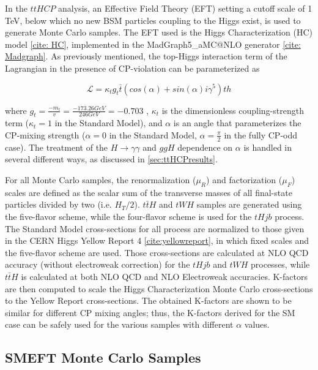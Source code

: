 In the $ttH CP$ analysis, an Effective Field Theory (EFT) setting a cutoff scale of 1 TeV, below which no new BSM particles coupling to the Higgs exist, is used to generate Monte Carlo samples. The EFT used is the Higgs Characterization (HC) model \ref{cite: HC}, implemented in the  MadGraph5_aMC@NLO generator \ref{cite: Madgraph}. As previously mentioned, the top-Higgs interaction term of the Lagrangian in the presence of CP-violation can be parameterized as

\begin{equation}
\mathcal{L} = \kappa_{t} g_{t} \bar{t} (cos(\alpha)+ sin(\alpha) i \gamma^{5} )th
\end{equation}

where $g_{t} = \frac{-m_{t}}{v} = \frac{-173.26 GeV}{246 GeV} = -0.703$ , $\kappa_{t}$ is the dimensionless coupling-strength term ($\kappa_{t}= 1$ in the Standard Model), and $\alpha$ is an angle that parameterizes the CP-mixing strength ($\alpha = 0$ in the Standard Model, $\alpha = \frac{\pi}{2}$ in the fully CP-odd case). The treatment of the $H \rightarrow \gamma \gamma$ and $ggH$ dependence on $\alpha$ is handled in several different ways, as discussed in \ref{sec:ttHCPresults}.

For all Monte Carlo samples, the renormalization ($μ_{R}$) and factorization ($μ_{F}$) scales are defined as the scalar sum of the transverse masses of all final-state particles divided by two (i.e. $H_{T}/2$). $t\bar{t}H$ and $tWH$ samples are generated using the five-flavor scheme, while the four-flavor scheme is used for the $tHjb$ process. The Standard Model cross-sections for all process are normalized to those given in the CERN Higgs Yellow Report 4 \ref{cite:yellowreport}, in which fixed scales and the five-flavor scheme are used. Those cross-sections are calculated at NLO QCD accuracy (without electroweak correction) for the $tHjb$ and $tWH$ processes, while $t\bar{t}H$ is calculated at both NLO QCD and NLO Electroweak accuracies. K-factors are then computed to scale the Higgs Characterization Monte Carlo cross-sections to the Yellow Report cross-sections. The obtained K-factors are shown to be similar for different CP mixing angles; thus, the K-factors derived for the SM case can be safely used for the various samples with different $\alpha$ values. 



\subsection{SMEFT Monte Carlo Samples} \label{sec:SMEFTMC} 







